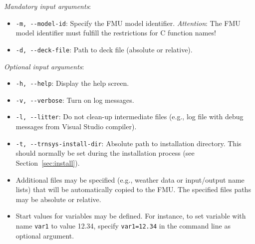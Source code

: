 \begin{enumerate}
\textit{Mandatory input arguments}:
  \begin{itemize}
    \item \verb!-m, --model-id!: Specify the FMU model identifier. \emph{Attention}: The FMU model identifier must fulfill the restrictions for C function names!
    \item \verb!-d, --deck-file!: Path to \trnsys deck file (absolute or relative).
  \end{itemize}
  \textit{Optional input arguments}:
  \begin{itemize}
    \item \verb!-h, --help!: Display the help screen.
    \item \verb!-v, --verbose!: Turn on log messages.
    \item \verb!-l, --litter!: Do not clean-up intermediate files (e.g., log file with debug messages from Visual Studio compiler).
    \item \verb!-t, --trnsys-install-dir!: Absolute path to \trnsys installation directory. This should normally be set during the installation process (see Section~\ref{sec:install}).
	\item Additional files may be specified (e.g., weather data or input/output name lists) that will be automatically copied to the FMU. The specified files paths may be absolute or relative.
	\item Start values for variables may be defined. For instance, to set variable with name \verb!var1! to value 12.34, specify \verb!var1=12.34! in the command line as optional argument.
  \end{itemize}
\end{enumerate}


